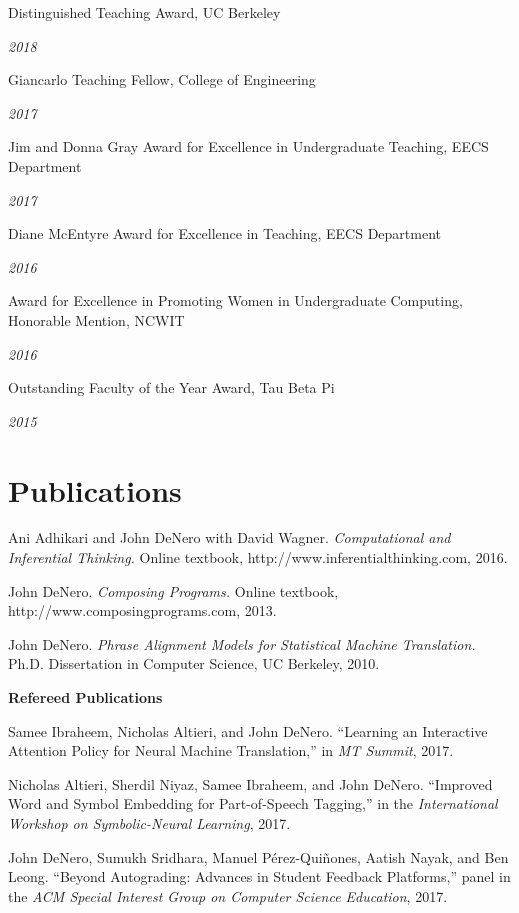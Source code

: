 \documentclass[margin,line]{res}
\newcommand{\dated}[2]{\parbox[t]{4.4in}{#1} \hspace{0.4in}
											 \parbox[t]{1in}{ {\it #2 } } }
\begin{document}
\begin{resume}
\dated{Distinguished Teaching Award, UC Berkeley} { 2018 }

\dated{Giancarlo Teaching Fellow, College of Engineering} { 2017 }

\dated{Jim and Donna Gray Award for Excellence in Undergraduate Teaching, EECS Department} { 2017 }

\dated{Diane McEntyre Award for Excellence in Teaching, EECS Department} { 2016 }

\dated{Award for Excellence in Promoting Women in Undergraduate Computing, Honorable Mention, NCWIT} { 2016 }

%
\dated{Outstanding Faculty of the Year Award, Tau Beta Pi} { 2015 }

%
%
%

\section{\sc Publications}

Ani Adhikari and John DeNero with David Wagner. {\it Computational and
Inferential Thinking.} Online textbook, http://www.inferentialthinking.com,
2016.

John DeNero. {\it Composing Programs.} Online textbook,
http://www.composingprograms.com, 2013.

John DeNero. {\it Phrase Alignment Models for Statistical Machine Translation.}
Ph.D. Dissertation in Computer Science, UC Berkeley, 2010.

{\bf Refereed Publications }

Samee Ibraheem, Nicholas Altieri, and John DeNero. ``Learning an Interactive Attention Policy for Neural Machine Translation,'' in {\it MT Summit}, 2017.

Nicholas Altieri, Sherdil Niyaz, Samee Ibraheem, and John DeNero. ``Improved Word and Symbol Embedding for Part-of-Speech Tagging,'' in the {\it International Workshop on Symbolic-Neural Learning}, 2017.

John DeNero, Sumukh Sridhara, Manuel P\'erez-Qui\~nones, Aatish Nayak, and Ben Leong. ``Beyond Autograding: Advances in Student Feedback Platforms,'' panel in the {\it ACM Special Interest Group on Computer Science Education}, 2017.


\end{resume}
\end{document}
